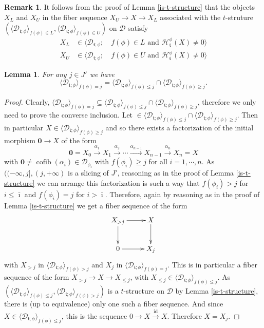 \documentclass{article}
\newtheorem{lem}[thm]{Lemma}
\theoremstyle{definition}
\newtheorem{rem}[thm]{Remark}
\newcommand{\tee}{\mathfrak{t}}
\DeclareMathOperator{\cofib}{cofib}
\begin{document}
\begin{rem}\label{a-closer-look}
It follows from the proof of Lemma \ref{is-t-structure} that the objects $X_L$ and $X_U$ in the fiber sequence $X_U\to X\to X_L$ associated with the $t$-struture $(\langle \mathscr{D}_{\tee;\phi}\rangle_{f(\phi)\in L},\langle \mathscr{D}_{\tee;\phi}\rangle_{f(\phi)\in U})$ on $\mathscr{D}$ satisfy
\begin{align*}
X_L&\in \langle \mathscr{D}_{\tee;\phi};\quad f(\phi)\in L \text{ and }\mathcal{H}^\phi_\tee(X)\neq 0\rangle\\
X_U&\in \langle \mathscr{D}_{\tee;\phi};\quad f(\phi)\in U \text{ and }\mathcal{H}^\phi_\tee(X)\neq 0\rangle
\end{align*}
\end{rem}

\begin{lem}\label{slices}
For any $j\in J'$ we have
\[
\langle \mathscr{D}_{\tee;\phi}\rangle_{f(\phi)=j}=\langle \mathscr{D}_{\tee;\phi}\rangle_{f(\phi)\leq j}\cap \langle \mathscr{D}_{\tee;\phi}\rangle_{f(\phi)\geq j}.
\]
\end{lem}
\begin{proof}
Clearly, $\langle \mathscr{D}_{\tee;\phi}\rangle_{f(\phi)=j}\subseteq \langle \mathscr{D}_{\tee;\phi}\rangle_{f(\phi)\leq j}\cap \langle \mathscr{D}_{\tee;\phi}\rangle_{f(\phi)\geq j}$, therefore we only need to prove the converse inclusion. Let $\in \langle \mathscr{D}_{\tee;\phi}\rangle_{f(\phi)\leq j}\cap \langle \mathscr{D}_{\tee;\phi}\rangle_{f(\phi)\geq j}$. Then in particular 
$X\in \langle \mathscr{D}_{\tee;\phi}\rangle_{f(\phi)\geq j}$
and so there exists a factorization of the initial morphism $\mathbf{0} \to X$ of the form
\[
\mathbf{0}=X_0 \xrightarrow{\alpha_1} X_1\xrightarrow{\alpha_2}\cdots \xrightarrow{\alpha_{n-1}}X_{n-1}\xrightarrow{\alpha_n} X_n=X
\]
with $\mathbf{0} \neq \cofib(\alpha_i) \in \mathscr{D}_{\phi_i}$ with $f(\phi_i)\geq j$ for all $i = 1, \cdots, n$. As $((-\infty,j],(j,+\infty)$ is a slicing of $J'$, reasoning as in the proof of Lemma \ref{is-t-structure} we can arrange this factorization is such a way that $f(\phi_i)>j$ for $i\leq \bar{\imath}$ and $f(\phi_i)= j$ for $i>\bar{\imath}$. Therefore, again by reasoning as in the proof of Lemma \ref{is-t-structure} we get a fiber sequence of the form
\[
\xymatrix{
X_{>j}\ar[r]\ar[d] & X\ar[d]\\
0\ar[r]&X_{j}
}
\]
with $X_{>j}$ in $\langle \mathscr{D}_{\tee;\phi}\rangle_{f(\phi)>j}$ and $X_j$ in $\langle \mathscr{D}_{\tee;\phi}\rangle_{f(\phi)=j}$. This is in particular a fiber sequence of the form $X_{>j}\to X\to X_{\leq j}$, with $X_{\leq j}\in \langle \mathscr{D}_{\tee;\phi}\rangle_{f(\phi)\leq j}$. 
As $(\langle \mathscr{D}_{\tee;\phi}\rangle_{f(\phi)\leq j},\langle \mathscr{D}_{\tee;\phi}\rangle_{f(\phi)> j})$ is a $t$-structure on $\mathscr{D}$ by Lemma \ref{is-t-structure}, there is (up to equivalence) only one such a fiber sequence. And since $X\in \langle \mathscr{D}_{\tee;\phi}\rangle_{f(\phi)\leq j}$, this is the sequence $0\to X\xrightarrow{\mathrm{id}} X$. Therefore $X=X_j$.
\end{proof}
\end{document}
